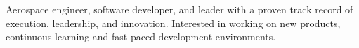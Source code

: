 \documentclass[a4paper]{article}
\begin{document}
Aerospace engineer, software developer, and leader with a proven track record of execution, leadership, and innovation. Interested in working on new products, continuous learning and fast paced development environments.
\linebreak
\linebreak
{}






\end{document}
